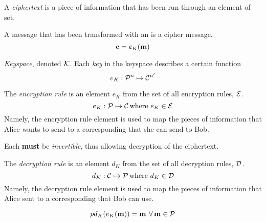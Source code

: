 \begin{definition}[Ciphertext]\label{def:Ciphertext}
  A \emph{ciphertext} is a piece of  information that has been run through an element of  set.

  A message that has been transformed with an  is a cipher message.
  \begin{equation}\label{eq:Ciphertext}
    \operatorname{\mathbf{c}} = e_{K} (\operatorname{\mathbf{m}})
  \end{equation}
\end{definition}

\begin{definition}[Keyspace]\label{def:Keyspace}
  \emph{Keyspace}, denoted $\operatorname{\mathcal{K}}$.
  Each \emph{key} in the keyspace describes a certain function
  \begin{equation}\label{eq:Keyspace}
    e_{K} : \operatorname{\mathcal{P}}^{n} \mapsto \operatorname{\mathcal{C}}^{n'}
  \end{equation}
\end{definition}

\begin{definition}\label{def:Encryption_Rule}
  The \emph{encryption rule} is an element $e_{K}$ from the set of all encryption rules, $\operatorname{\mathcal{E}}$.
  \begin{equation}\label{eq:Encryption_Rule}
    e_{K} : \operatorname{\mathcal{P}} \mapsto \operatorname{\mathcal{C}} \text{where } e_{K} \in \operatorname{\mathcal{E}}
  \end{equation}
  Namely, the encryption rule element is used to map the  pieces of information that Alice wants to send to a corresponding  that she can send to Bob.

  \begin{remark}[Invertible]\label{rmk:Encryption_Rule_Invertible}
    Each  \textbf{must} be \emph{invertible}, thus allowing decryption of the ciphertext.
  \end{remark}
\end{definition}

\begin{definition}\label{def:Decryption_Rule}
  The \emph{decryption rule} is an element $d_{K}$ from the set of all decryption rules, $\operatorname{\mathcal{D}}$.
  \begin{equation}\label{eq:Decryption_Rule}
    d_{K} : \operatorname{\mathcal{C}} \mapsto \operatorname{\mathcal{P}} \text{where } d_{K} \in \operatorname{\mathcal{D}}
  \end{equation}
  Namely, the decryption rule element is used to map the  pieces of information that Alice sent to a corresponding  that Bob can use.

  \begin{remark}
    \begin{equation}\label{eq:Decrypt_Encryption}
p      d_{K}(e_{K}(\operatorname{\mathbf{m}})) = \operatorname{\mathbf{m}} \: \forall \operatorname{\mathbf{m}} \in \operatorname{\mathcal{P}}
    \end{equation}
  \end{remark}
\end{definition}


